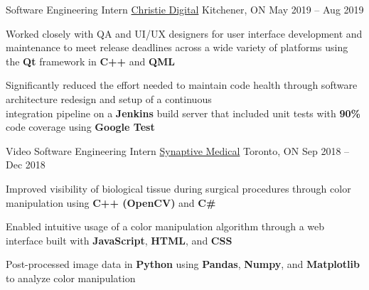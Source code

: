 \documentclass[]{awesome-cv}
\begin{document}
\begin{cventries}
{\begin{cvitems}
		\end{cvitems}}
	\cventry
	{Software Engineering Intern}
	{\href{https://www.christiedigital.com/}{Christie Digital}}
	{Kitchener, ON}
	{May 2019 – Aug 2019}
	{\begin{cvitems}
		\item {Worked closely with QA and UI/UX designers for user interface development and maintenance to meet release deadlines across a wide variety of platforms using the \textbf{Qt} framework in \textbf{C++} and \textbf{QML}}
		\item {Significantly reduced the effort needed to maintain code health through software architecture redesign and setup of a continuous \\integration pipeline on a \textbf{Jenkins} build server that included unit tests with \textbf{90\%} code coverage using \textbf{Google Test}}
		\end{cvitems}}
	\cventry
	{Video Software Engineering Intern}
	{\href{https://www.synaptivemedical.com/}{Synaptive Medical}}
	{Toronto, ON}
	{Sep 2018 – Dec 2018}
	{\begin{cvitems}
		\item {Improved visibility of biological tissue during surgical procedures through color manipulation using \textbf{C++ (OpenCV)} and \textbf{C\#}}
		\item {Enabled intuitive usage of a color manipulation algorithm through a web interface built with \textbf{JavaScript}, \textbf{HTML}, and \textbf{CSS}}
		\item {Post-processed image data in \textbf{Python} using \textbf{Pandas}, \textbf{Numpy}, and \textbf{Matplotlib} to analyze color manipulation}
		\end{cvitems}}
\end{cventries}
\end{document}
